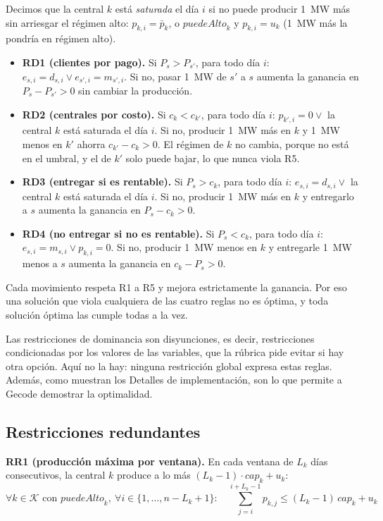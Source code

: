 Decimos que la central $k$ está \textit{saturada} el día $i$ si no puede producir 1~MW más sin arriesgar el régimen alto: $p_{k,i} = \bar{p}_k$, o $\mathit{puedeAlto}_k$ y $p_{k,i} = u_k$ (1~MW más la pondría en régimen alto).

\begin{itemize}
    \item \textbf{RD1 (clientes por pago).} Si $P_s > P_{s'}$, para todo día $i$: $e_{s,i} = d_{s,i} \lor e_{s',i} = m_{s',i}$. Si no, pasar 1~MW de $s'$ a $s$ aumenta la ganancia en $P_s - P_{s'} > 0$ sin cambiar la producción.
    \item \textbf{RD2 (centrales por costo).} Si $c_k < c_{k'}$, para todo día $i$: $p_{k',i} = 0 \lor$ la central $k$ está saturada el día $i$. Si no, producir 1~MW más en $k$ y 1~MW menos en $k'$ ahorra $c_{k'} - c_k > 0$. El régimen de $k$ no cambia, porque no está en el umbral, y el de $k'$ solo puede bajar, lo que nunca viola R5.
    \item \textbf{RD3 (entregar si es rentable).} Si $P_s > c_k$, para todo día $i$: $e_{s,i} = d_{s,i} \lor$ la central $k$ está saturada el día $i$. Si no, producir 1~MW más en $k$ y entregarlo a $s$ aumenta la ganancia en $P_s - c_k > 0$.
    \item \textbf{RD4 (no entregar si no es rentable).} Si $P_s < c_k$, para todo día $i$: $e_{s,i} = m_{s,i} \lor p_{k,i} = 0$. Si no, producir 1~MW menos en $k$ y entregarle 1~MW menos a $s$ aumenta la ganancia en $c_k - P_s > 0$.
\end{itemize}

Cada movimiento respeta R1 a R5 y mejora estrictamente la ganancia. Por eso una solución que viola cualquiera de las cuatro reglas no es óptima, y toda solución óptima las cumple todas a la vez.

Las restricciones de dominancia son disyunciones, es decir, restricciones condicionadas por los valores de las variables, que la rúbrica pide evitar si hay otra opción. Aquí no la hay: ninguna restricción global expresa estas reglas. Además, como muestran los Detalles de implementación, son lo que permite a Gecode demostrar la optimalidad.

\subsection{Restricciones redundantes}

\textbf{RR1 (producción máxima por ventana).} En cada ventana de $L_k$ días consecutivos, la central $k$ produce a lo más $(L_k - 1) \cdot \mathit{cap}_k + u_k$:
\[
    \forall k \in \mathcal{K} \text{ con } \mathit{puedeAlto}_k,\ \forall i \in \{1, \dots, n - L_k + 1\}:\quad \sum_{j=i}^{i+L_k-1} p_{k,j} \le (L_k - 1)\,\mathit{cap}_k + u_k
\]

